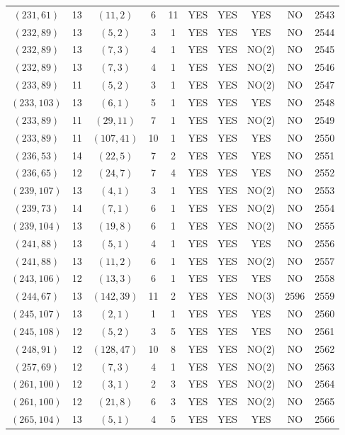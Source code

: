 \begin{longtable}{|c|c|c|c|c|c|c|c|c|c|}
$(231, 61)$ & 13 & $(11, 2)$ & 6 & 11 & YES & YES & YES & NO & 2543\\
$(232, 89)$ & 13 & $(5, 2)$ & 3 & 1 & YES & YES & YES & NO & 2544\\
$(232, 89)$ & 13 & $(7, 3)$ & 4 & 1 & YES & YES & NO(2) & NO & 2545\\
$(232, 89)$ & 13 & $(7, 3)$ & 4 & 1 & YES & YES & NO(2) & NO & 2546\\
$(233, 89)$ & 11 & $(5, 2)$ & 3 & 1 & YES & YES & NO(2) & NO & 2547\\
$(233, 103)$ & 13 & $(6, 1)$ & 5 & 1 & YES & YES & YES & NO & 2548\\
$(233, 89)$ & 11 & $(29, 11)$ & 7 & 1 & YES & YES & NO(2) & NO & 2549\\
$(233, 89)$ & 11 & $(107, 41)$ & 10 & 1 & YES & YES & YES & NO & 2550\\
$(236, 53)$ & 14 & $(22, 5)$ & 7 & 2 & YES & YES & YES & NO & 2551\\
$(236, 65)$ & 12 & $(24, 7)$ & 7 & 4 & YES & YES & YES & NO & 2552\\
$(239, 107)$ & 13 & $(4, 1)$ & 3 & 1 & YES & YES & NO(2) & NO & 2553\\
$(239, 73)$ & 14 & $(7, 1)$ & 6 & 1 & YES & YES & NO(2) & NO & 2554\\
$(239, 104)$ & 13 & $(19, 8)$ & 6 & 1 & YES & YES & NO(2) & NO & 2555\\
$(241, 88)$ & 13 & $(5, 1)$ & 4 & 1 & YES & YES & YES & NO & 2556\\
$(241, 88)$ & 13 & $(11, 2)$ & 6 & 1 & YES & YES & NO(2) & NO & 2557\\
$(243, 106)$ & 12 & $(13, 3)$ & 6 & 1 & YES & YES & YES & NO & 2558\\
$(244, 67)$ & 13 & $(142, 39)$ & 11 & 2 & YES & YES & NO(3) & 2596 & 2559\\
$(245, 107)$ & 13 & $(2, 1)$ & 1 & 1 & YES & YES & YES & NO & 2560\\
$(245, 108)$ & 12 & $(5, 2)$ & 3 & 5 & YES & YES & YES & NO & 2561\\
$(248, 91)$ & 12 & $(128, 47)$ & 10 & 8 & YES & YES & NO(2) & NO & 2562\\
$(257, 69)$ & 12 & $(7, 3)$ & 4 & 1 & YES & YES & NO(2) & NO & 2563\\
$(261, 100)$ & 12 & $(3, 1)$ & 2 & 3 & YES & YES & NO(2) & NO & 2564\\
$(261, 100)$ & 12 & $(21, 8)$ & 6 & 3 & YES & YES & NO(2) & NO & 2565\\
$(265, 104)$ & 13 & $(5, 1)$ & 4 & 5 & YES & YES & YES & NO & 2566\\

\end{longtable}
